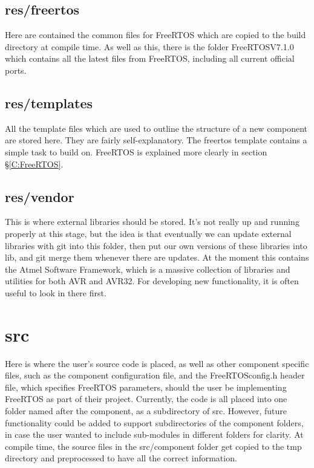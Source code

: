 \documentclass[a4paper, oneside, 11pt, titlepage, onecolumn, openright]{report}
\begin{document}
		
\subsection{res/freertos}
			\label{ss:res/freertos}
			Here are contained the common files for FreeRTOS which are copied to the build directory at compile time. As well as this, there is the folder FreeRTOSV7.1.0 which contains all the latest files from FreeRTOS, including all current official ports. 
			
\subsection{res/templates}
			\label{ss:res/templates}
			All the template files which are used to outline the structure of a new component are stored here. They are fairly self-explanatory. The freertos template contains a simple task to build on. FreeRTOS is explained more clearly in section \S\ref{C:FreeRTOS}.
			
\subsection{res/vendor}
			\label{ss:res/vendor}
			This is where external libraries should be stored. It's not really up and running properly at this stage, but the idea is that eventually we can update external libraries with git into this folder, then put our own versions of these libraries into lib, and git merge them whenever there are updates. At the moment this contains the Atmel Software Framework, which is a massive collection of libraries and utilities for both AVR and AVR32. For developing new functionality, it is often useful to look in there first.
			
\section{src}
			\label{s:src}
			Here is where the user's source code is placed, as well as other component specific files, such as the component configuration file, and the FreeRTOSconfig.h header file, which specifies FreeRTOS parameters, should the user be implementing FreeRTOS as part of their project.
			Currently, the code is all placed into one folder named after the component, as a subdirectory of src. However, future functionality could be added to support subdirectories of the component folders, in case the user wanted to include sub-modules in different folders for clarity.
			At compile time, the source files in the src/component folder get copied to the tmp directory and preprocessed to have all the correct information.
			
\end{document}
